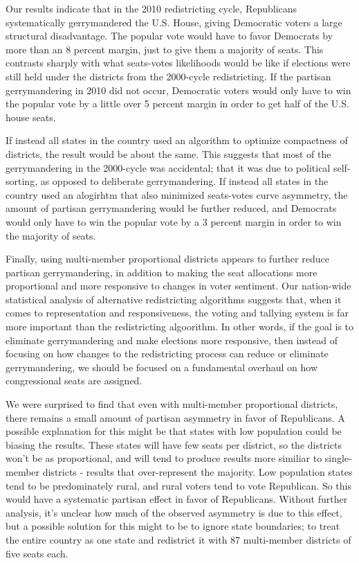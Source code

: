 \documentclass[preprint,12pt]{article}
\begin{document}
Our results indicate that in the 2010 redistricting cycle, Republicans systematically gerrymandered the U.S. House, giving Democratic voters a large structural disadvantage. The popular vote would have to favor Democrats by more than an 8 percent margin, just to give them a majority of seats.  This contrasts sharply with what seats-votes likelihoods would be like if elections were still held under the districts from the 2000-cycle redistricting.  If the partisan gerrymandering in 2010 did not occur, Democratic voters would only have to win the popular vote by a little over 5 percent margin in order to get half of the U.S. house seats.

If instead all states in the country used an algorithm to optimize compactness of districts, the result would be about the same.  This suggests that most of the gerrymandering in the 2000-cycle was accidental; that it was due to political self-sorting, as opposed to deliberate gerrymandering.  If instead all states in the country used an alogirhtm that also minimized seats-votes curve asymmetry, the amount of partisan gerrymandering would be further reduced, and Democrats would only have to win the popular vote by a 3 percent margin in order to win the majority of seats.

Finally, using multi-member proportional districts appears to further reduce partisan gerrymandering, in addition to making the seat allocations more proportional and more responsive to changes in voter sentiment.  Our nation-wide statistical analysis of alternative redistricting algorithms suggests that, when it comes to representation and responsiveness, the voting and tallying system is far more important than the redistricting algoorithm.  In other words, if the goal is to eliminate gerrymandering and make elections more responsive, then instead of focusing on how changes to the redistricting process can reduce or eliminate gerrymandering, we should be focused on a fundamental overhaul on how congressional seats are assigned.

We were surprised to find that even with multi-member proportional districts, there remains a small amount of partisan asymmetry in favor of Republicans.
A possible explanation for this might be that states with low population could be biasing the results.
These states will have few seats per district, so the districts won't be as proportional, and will tend to produce results more similiar to single-member districts - results that over-represent the majority.
Low population states tend to be predominately rural, and rural voters tend to vote Republican.  So this would have a systematic partisan effect in favor of Republicans.
Without further analysis, it's unclear how much of the observed asymmetry is due to this effect, but a possible solution for this might to be to ignore state boundaries; to treat the entire country as one state and redistrict it with 87 multi-member districts of five seats each.
\end{document}
